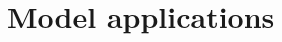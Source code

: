 \documentclass[journal abbreviation, manuscript]{copernicus}
\begin{document}

\section{Model applications} \label{Section:UseCases}
\end{document}
